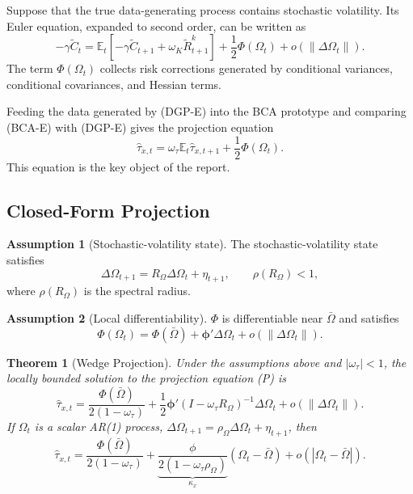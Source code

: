 \documentclass[11pt]{article}
\newcommand{\E}{\mathbb{E}}
\theoremstyle{plain}
\newtheorem{theorem}{Theorem}
\theoremstyle{definition}
\newtheorem{assumption}{Assumption}
\begin{document}
Suppose that the true data-generating process contains stochastic volatility.
Its Euler equation, expanded to second order, can be written as
\begin{equation}
-\gamma\tilde C_t
=
\E_t\!\left[
-\gamma\tilde C_{t+1}
+\omega_K\tilde R^k_{t+1}
\right]
+\frac{1}{2}\Phi(\Omega_t)
+o(\|\Delta\Omega_t\|).
\tag{DGP-E}
\end{equation}
The term $\Phi(\Omega_t)$ collects risk corrections generated by conditional
variances, conditional covariances, and Hessian terms.

Feeding the data generated by (DGP-E) into the BCA prototype and comparing
(BCA-E) with (DGP-E) gives the projection equation
\begin{equation}
\boxed{
\hat\tau_{x,t}
=
\omega_\tau\E_t\hat\tau_{x,t+1}
+\frac{1}{2}\Phi(\Omega_t)
}.
\tag{P}
\end{equation}
This equation is the key object of the report.

\subsection{Closed-Form Projection}

\begin{assumption}[Stochastic-volatility state]
The stochastic-volatility state satisfies
\[
\Delta\Omega_{t+1}
=
R_\Omega\Delta\Omega_t+\eta_{t+1},
\qquad
\rho(R_\Omega)<1,
\]
where $\rho(R_\Omega)$ is the spectral radius.
\end{assumption}

\begin{assumption}[Local differentiability]
$\Phi$ is differentiable near $\bar\Omega$ and satisfies
\[
\Phi(\Omega_t)
=
\Phi(\bar\Omega)
+\bm{\phi}'\Delta\Omega_t
+o(\|\Delta\Omega_t\|).
\]
\end{assumption}

\begin{theorem}[Wedge Projection]
Under the assumptions above and $|\omega_\tau|<1$, the locally bounded solution
to the projection equation (P) is
\begin{equation}
\boxed{
\hat\tau_{x,t}
=
\frac{\Phi(\bar\Omega)}{2(1-\omega_\tau)}
+
\frac{1}{2}\bm{\phi}'
(I-\omega_\tau R_\Omega)^{-1}
\Delta\Omega_t
+o(\|\Delta\Omega_t\|)
}.
\tag{T1}
\end{equation}
If $\Omega_t$ is a scalar AR(1) process,
$\Delta\Omega_{t+1}=\rho_\Omega\Delta\Omega_t+\eta_{t+1}$, then
\begin{equation}
\hat\tau_{x,t}
=
\frac{\Phi(\bar\Omega)}{2(1-\omega_\tau)}
+
\underbrace{
\frac{\phi}{2(1-\omega_\tau\rho_\Omega)}
}_{\kappa_x}
(\Omega_t-\bar\Omega)
+o(|\Omega_t-\bar\Omega|).
\tag{T1s}
\end{equation}
\end{theorem}
\end{document}
